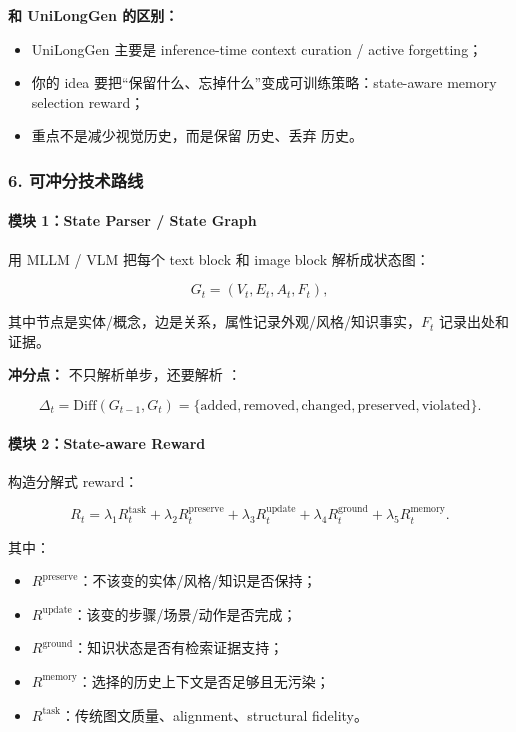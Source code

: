 \textbf{和 UniLongGen 的区别：}

\begin{itemize}[leftmargin=1.5em]
  \item UniLongGen 主要是 inference-time context curation / active forgetting；
  \item 你的 idea 要把“保留什么、忘掉什么”变成可训练策略：state-aware memory selection reward；
  \item 重点不是减少视觉历史，而是保留  历史、丢弃  历史。
\end{itemize}

\subsubsection*{6. 可冲分技术路线}

\paragraph{模块 1：State Parser / State Graph}

用 MLLM / VLM 把每个 text block 和 image block 解析成状态图：

\[
G_t=(V_t,E_t,A_t,F_t),
\]

其中节点是实体/概念，边是关系，属性记录外观/风格/知识事实，$F_t$ 记录出处和证据。

\textbf{冲分点：} 不只解析单步，还要解析 ：

\[
\Delta_t =
\mathrm{Diff}(G_{t-1},G_t)
=
\{\text{added},\text{removed},\text{changed},\text{preserved},\text{violated}\}.
\]

\paragraph{模块 2：State-aware Reward}

构造分解式 reward：

\[
R_t =
\lambda_1 R^\text{task}_t
+
\lambda_2 R^\text{preserve}_t
+
\lambda_3 R^\text{update}_t
+
\lambda_4 R^\text{ground}_t
+
\lambda_5 R^\text{memory}_t.
\]

其中：

\begin{itemize}[leftmargin=1.5em]
  \item $R^\text{preserve}$：不该变的实体/风格/知识是否保持；
  \item $R^\text{update}$：该变的步骤/场景/动作是否完成；
  \item $R^\text{ground}$：知识状态是否有检索证据支持；
  \item $R^\text{memory}$：选择的历史上下文是否足够且无污染；
  \item $R^\text{task}$：传统图文质量、alignment、structural fidelity。
\end{itemize}

